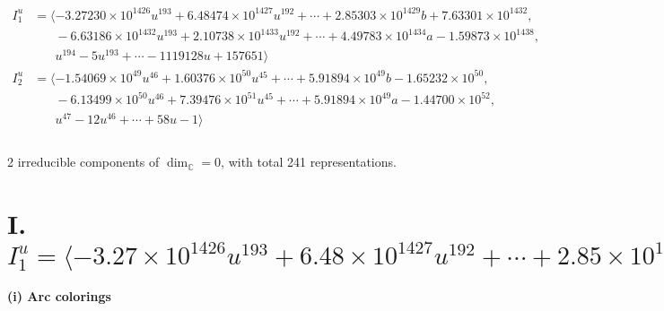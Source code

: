 \documentclass[1p]{elsarticle_modified}
\theoremstyle{definition}
\begin{document}
\begin{align*}
I^u_{1}&=\langle 
-3.27230\times10^{1426} u^{193}+6.48474\times10^{1427} u^{192}+\cdots+2.85303\times10^{1429} b+7.63301\times10^{1432},\\
\phantom{I^u_{1}}&\phantom{= \langle  }-6.63186\times10^{1432} u^{193}+2.10738\times10^{1433} u^{192}+\cdots+4.49783\times10^{1434} a-1.59873\times10^{1438},\\
\phantom{I^u_{1}}&\phantom{= \langle  }u^{194}-5 u^{193}+\cdots-1119128 u+157651\rangle \\
I^u_{2}&=\langle 
-1.54069\times10^{49} u^{46}+1.60376\times10^{50} u^{45}+\cdots+5.91894\times10^{49} b-1.65232\times10^{50},\\
\phantom{I^u_{2}}&\phantom{= \langle  }-6.13499\times10^{50} u^{46}+7.39476\times10^{51} u^{45}+\cdots+5.91894\times10^{49} a-1.44700\times10^{52},\\
\phantom{I^u_{2}}&\phantom{= \langle  }u^{47}-12 u^{46}+\cdots+58 u-1\rangle \\
\\
\end{align*}
\raggedright * 2 irreducible components of $\dim_{\mathbb{C}}=0$, with total 241 representations.\\
\newpage
\renewcommand{\arraystretch}{1}
\centering \section*{I. $I^u_{1}= \langle -3.27\times10^{1426} u^{193}+6.48\times10^{1427} u^{192}+\cdots+2.85\times10^{1429} b+7.63\times10^{1432},\;-6.63\times10^{1432} u^{193}+2.11\times10^{1433} u^{192}+\cdots+4.50\times10^{1434} a-1.60\times10^{1438},\;u^{194}-5 u^{193}+\cdots-1119128 u+157651 \rangle$}
\flushleft \textbf{(i) Arc colorings}\\
\end{document}
